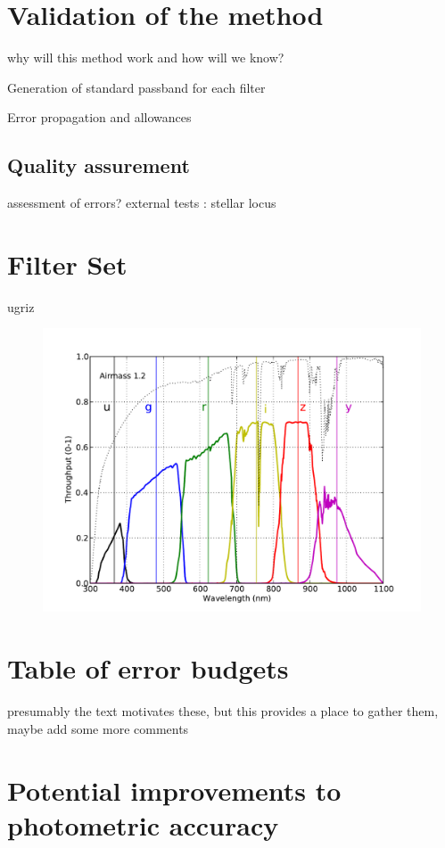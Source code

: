 \documentclass[12pt,preprint]{aastex}
\begin{document}
\section{Validation of the method}

why will this method work and how will we know?

Generation of standard passband for each filter

Error propagation and allowances


\subsection{Quality assurement}
assessment of errors? 
external tests : stellar locus 


\appendix

\section{Filter Set}
ugriz
\begin{figure}[ht]
\includegraphics[width=5in]{filters}
\end{figure}


\section{Table of error budgets}

presumably the text motivates these, but this provides a place to
gather them, maybe add some more comments


\section{Potential improvements to photometric accuracy}
\end{document}
